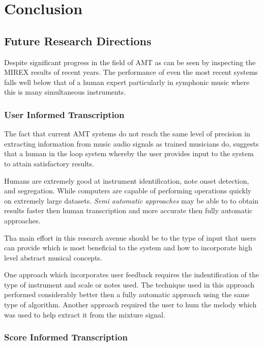 \chapter{Conclusion}
\label{ch:concl}

\section{Future Research Directions}

Despite significant progress in the field of AMT as can be seen by inspecting
the MIREX results \cite{MIREX} of recent years. The performance of even the most
recent systems falls well below that of a human expert particularly in symphonic
music where this is many simultaneous instruments. \cite{roadmap-MIR:Serra2013}

\subsection{User Informed Transcription}

The fact that current AMT systems do not reach the same level of precision in
extracting information from music audio signals as trained musicians do,
suggests that a human in the loop system whereby the user provides input to the
system to attain satisfactory results.

Humans are extremely good at instrument identification, note onset detection,
and segregation. While computers are capable of performing operations quickly on
extremely large datasets. \cite{ISMIR-tut:Benetos} \emph{Semi automatic
    approaches} may be able to to obtain results faster then human transcription and
more accurate then fully automatic approaches. \cite{ISMIR-tut:Benetos}

Tha main effort in this research avenue should be to the type of input that
users can provide which is most beneficial to the system and how to incorporate
high level abstract musical concepts.

One approach which incorporates user feedback requires the indentification of
the type of instrument and scale or notes used. \cite{user-inform:Kirchoff2012}
The technique used in this approach performed considerably better then a fully
automatic approach using the same type of algorithm. Another approach required
the user to hum the melody which was used to help extract it from the mixture
signal. \cite{humming2009:Smaragdis}

\subsection{Score Informed Transcription}

